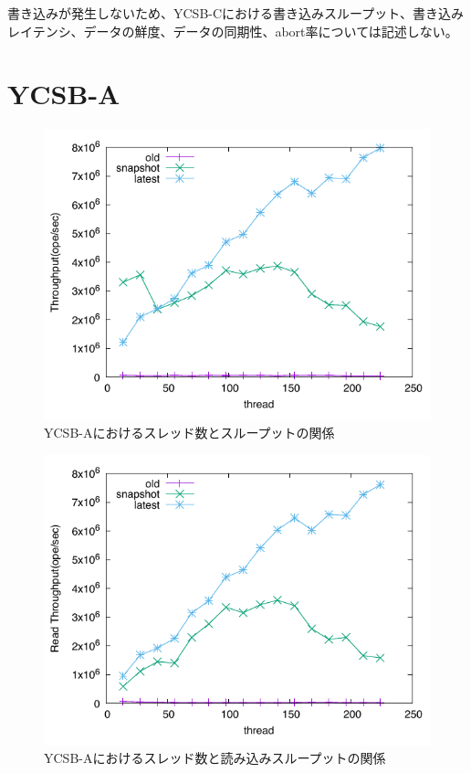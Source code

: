 \documentclass[a4paper]{jreport}	%
\begin{document}
書き込みが発生しないため、YCSB-Cにおける書き込みスループット、書き込みレイテンシ、データの鮮度、データの同期性、abort率については記述しない。

\section{YCSB-A}
\label{section:ycsb-a}

\begin{figure}[h] 
\centering
\includegraphics[width=15cm]{ycsb-a/opposite-throughput}
\caption{YCSB-Aにおけるスレッド数とスループットの関係}
\label{fig:a-throughput}
\end{figure}


\begin{figure}[h] 
\centering
\includegraphics[width=15cm]{ycsb-a/opposite-read-throughput}
\caption{YCSB-Aにおけるスレッド数と読み込みスループットの関係}
\label{fig:a-throughput-read}
\end{figure}
\end{document}
